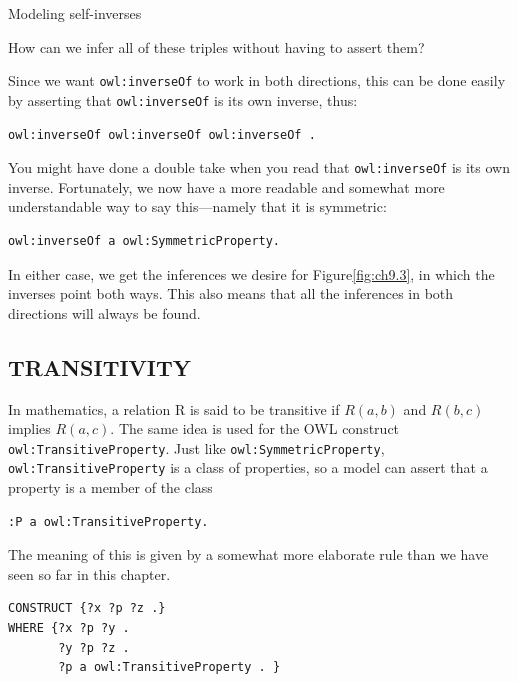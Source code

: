 \begin{challenge}{Modeling self-inverses}

How can we infer all of these triples without having to assert them?

\solution

Since we want \texttt{owl:inverseOf} to work in both directions, this can be done
easily by asserting that
\texttt{owl:inverseOf} is its own inverse, thus:

\begin{lstlisting}
owl:inverseOf owl:inverseOf owl:inverseOf .
\end{lstlisting}



You might have done a double take when you read that \texttt{owl:inverseOf} is
its own inverse. Fortunately, we now have a more readable and somewhat
more understandable way to say this---namely that it is symmetric:

\begin{lstlisting}
owl:inverseOf a owl:SymmetricProperty.
\end{lstlisting}

In either case, we get the inferences we desire for Figure\ref{fig:ch9.3}, in which
the inverses point both ways. This also means that all the inferences in
both directions will always be found.

\subsection{TRANSITIVITY}

In mathematics, a relation R is said to be transitive if $R(a,b)$ and
$R(b,c)$ implies $R(a,c)$. The same idea is used for the OWL construct
\texttt{owl:TransitiveProperty}. Just like \texttt{owl:SymmetricProperty},
\texttt{owl:TransitiveProperty} is a class of properties, so a model can assert
that a property is a member of the class

\begin{lstlisting}
:P a owl:TransitiveProperty.
\end{lstlisting}

The meaning of this is given by a somewhat more elaborate rule than we
have seen so far in this chapter.

\begin{lstlisting}
CONSTRUCT {?x ?p ?z .}
WHERE {?x ?p ?y .
       ?y ?p ?z .
       ?p a owl:TransitiveProperty . }
\end{lstlisting}


\end{challenge}
